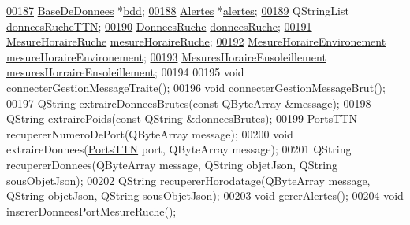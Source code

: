 \begin{DoxyCode}
\hyperlink{class_ruche_a8577fdedabdecd98652e338e83bb3b65}{00187}         \hyperlink{class_base_de_donnees}{BaseDeDonnees} *\hyperlink{class_ruche_a8577fdedabdecd98652e338e83bb3b65}{bdd}; 
\hyperlink{class_ruche_af07644ddce44cb5ed4286475dc0f9d46}{00188}         \hyperlink{class_alertes}{Alertes} *\hyperlink{class_ruche_af07644ddce44cb5ed4286475dc0f9d46}{alertes};
\hyperlink{class_ruche_a4556832042641c08a6ef2ab9d80d771e}{00189}         QStringList \hyperlink{class_ruche_a4556832042641c08a6ef2ab9d80d771e}{donneesRucheTTN};
\hyperlink{class_ruche_a1526bfa78f03e0710ad16f880a40c15f}{00190}         \hyperlink{struct_donnees_ruche}{DonneesRuche} \hyperlink{class_ruche_a1526bfa78f03e0710ad16f880a40c15f}{donneesRuche};
\hyperlink{class_ruche_a9a68d3b7eb272e139f1532fdcbca2da3}{00191}         \hyperlink{struct_mesure_horaire_ruche}{MesureHoraireRuche} \hyperlink{class_ruche_a9a68d3b7eb272e139f1532fdcbca2da3}{mesureHoraireRuche};
\hyperlink{class_ruche_a73a826506110c10d9221065670985e52}{00192}         \hyperlink{struct_mesure_horaire_environement}{MesureHoraireEnvironement} 
      \hyperlink{class_ruche_a73a826506110c10d9221065670985e52}{mesureHoraireEnvironement};
\hyperlink{class_ruche_a5e57df1ce7805b1ab0f6d8ef37504582}{00193}         \hyperlink{struct_mesures_horaire_ensoleillement}{MesuresHoraireEnsoleillement} 
      \hyperlink{class_ruche_a5e57df1ce7805b1ab0f6d8ef37504582}{mesuresHorraireEnsoleillement};
00194 
00195         \textcolor{keywordtype}{void} connecterGestionMessageTraite();
00196         \textcolor{keywordtype}{void} connecterGestionMessageBrut();
00197         QString extraireDonneesBrutes(\textcolor{keyword}{const} QByteArray &message);
00198         QString extrairePoids(\textcolor{keyword}{const} QString &donneesBrutes);
00199         \hyperlink{parametres_8h_a0fe68caa1e9147addc96657cc822b937}{PortsTTN} recupererNumeroDePort(QByteArray message);
00200         \textcolor{keywordtype}{void} extraireDonnees(\hyperlink{parametres_8h_a0fe68caa1e9147addc96657cc822b937}{PortsTTN} port, QByteArray message);
00201         QString recupererDonnees(QByteArray message, QString objetJson, QString sousObjetJson);
00202         QString recupererHorodatage(QByteArray message, QString objetJson, QString sousObjetJson);
00203         \textcolor{keywordtype}{void} gererAlertes();
00204         \textcolor{keywordtype}{void} insererDonneesPortMesureRuche();

\end{DoxyCode}
